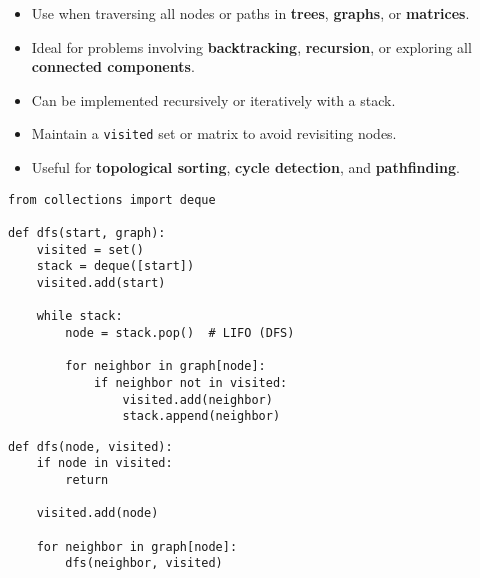 \begin{summary}
    \begin{itemize}
        \item Use when traversing all nodes or paths in \textbf{trees}, \textbf{graphs}, or \textbf{matrices}.
        \item Ideal for problems involving \textbf{backtracking}, \textbf{recursion}, or exploring all \textbf{connected components}.
        \item Can be implemented recursively or iteratively with a stack.
        \item Maintain a \texttt{visited} set or matrix to avoid revisiting nodes.
        \item Useful for \textbf{topological sorting}, \textbf{cycle detection}, and \textbf{pathfinding}.
    \end{itemize}
\end{summary}

\begin{algo}
\begin{lstlisting}
from collections import deque

def dfs(start, graph):
    visited = set()
    stack = deque([start])
    visited.add(start)

    while stack:
        node = stack.pop()  # LIFO (DFS)

        for neighbor in graph[node]:
            if neighbor not in visited:
                visited.add(neighbor)
                stack.append(neighbor) 
\end{lstlisting}
    \end{algo}

\begin{algo}
\begin{lstlisting}
def dfs(node, visited):
    if node in visited:
        return

    visited.add(node)

    for neighbor in graph[node]:
        dfs(neighbor, visited)
\end{lstlisting}
\end{algo}

\newpage

